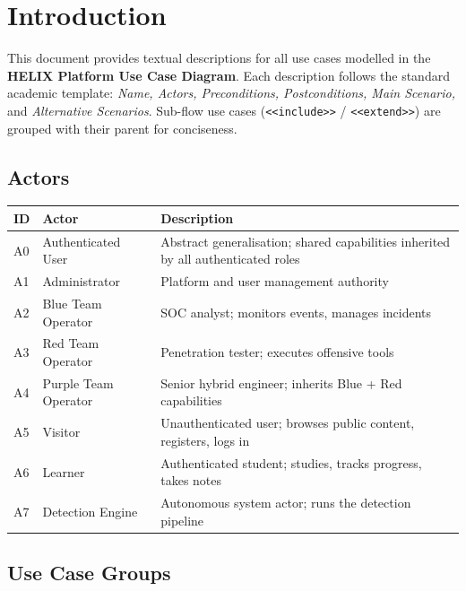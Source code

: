 \documentclass[12pt,a4paper]{report}
\begin{document}
\chapter*{Introduction}

This document provides textual descriptions for all use cases modelled in the
\textbf{HELIX Platform Use Case Diagram}. Each description follows the standard academic
template: \textit{Name, Actors, Preconditions, Postconditions, Main Scenario,} and
\textit{Alternative Scenarios}. Sub-flow use cases (\texttt{<<include>>} / \texttt{<<extend>>})
are grouped with their parent for conciseness.

\section*{Actors}

\begin{center}
    \begin{tabular}{C{1.0cm} L{3.2cm} L{6.5cm}}
        \toprule
        \textbf{ID} & \textbf{Actor} & \textbf{Description} \\
        \midrule
        A0 & Authenticated User & Abstract generalisation; shared capabilities inherited by all authenticated roles \\
        A1 & Administrator & Platform and user management authority \\
        A2 & Blue Team Operator & SOC analyst; monitors events, manages incidents \\
        A3 & Red Team Operator & Penetration tester; executes offensive tools \\
        A4 & Purple Team Operator & Senior hybrid engineer; inherits Blue + Red capabilities \\
        A5 & Visitor & Unauthenticated user; browses public content, registers, logs in \\
        A6 & Learner & Authenticated student; studies, tracks progress, takes notes \\
        A7 & Detection Engine & Autonomous system actor; runs the detection pipeline \\
        \bottomrule
    \end{tabular}
\end{center}

\section*{Use Case Groups}
\end{document}

